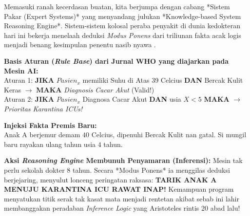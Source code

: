 Memasuki ranah kecerdasan buatan, kita berjumpa dengan cabang *Sistem Pakar (Expert Systems)* yang menyandang julukan *Knowledge-based System Reasoning Engine*. Sistem-sistem kolosal peraba penyakit di dunia kedokteran hari ini bekerja menelaah deduksi \textit{Modus Ponens} dari triliunan fakta acak logis menjadi benang kesimpulan penentu nasib nyawa \cite{mit_6042,saylor_cs202}.

\begin{contoh}

\textbf{Basis Aturan (\textit{Rule Base}) dari Jurnal WHO yang diajarkan pada Mesin AI:}\\
Aturan 1: \textbf{JIKA} $Pasien_{x}$ memiliki Suhu di Atas 39 Celcius \textbf{DAN} Bercak Kulit Keras $\rightarrow$ \textbf{MAKA} \textit{Diagnosis Cacar Akut} (Valid!)\\
Aturan 2: \textbf{JIKA} $Pasien_{x}$ Diagnosa Cacar Akut \textbf{DAN} usia $X < 5$ \textbf{MAKA} $\rightarrow$ \textit{Prioritas Karantina ICUs!}

\textbf{Injeksi Fakta Premis Baru:} \\
Anak A berjemur demam $40$ Celcius, dipenuhi Bercak Kulit nan gatal. Si mungil baru rayakan ulang tahun usia $4$ tahun.

\textbf{Aksi \textit{Reasoning Engine} Membunuh Penyamaran (Inferensi):} 
Mesin tak perlu sekolah dokter 8 tahun. Secara *Modus Ponens* ia menggilas deduksi berjejaring, menyulut lonceng peringatan raksasa: \textbf{TARIK ANAK A MENUJU KARANTINA ICU RAWAT INAP!} 
Kemampuan program menyatukan titik serak tak kasat mata menjadi rentetan akibat sebab ini lahir membanggakan peradaban \textit{Inference Logic} yang Aristoteles rintis 20 abad lalu! \cite{stanford_cs103}
\end{contoh}
